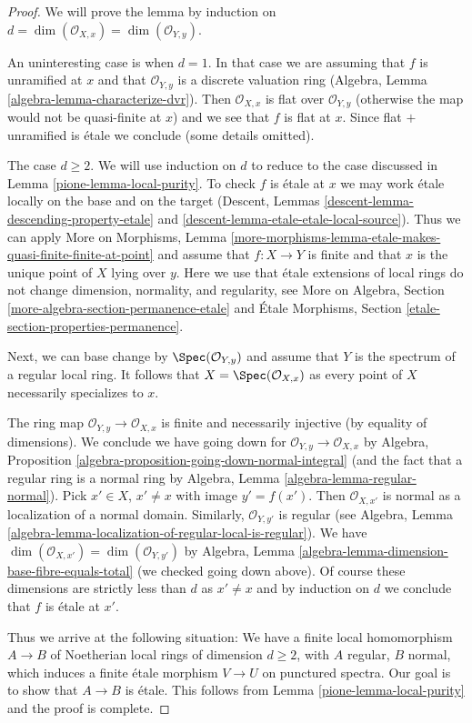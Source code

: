 \begin{proof}

We will prove the lemma by induction on
$d = \dim(\mathcal{O}_{X, x}) = \dim(\mathcal{O}_{Y, y})$.

\medskip\noindent
An uninteresting case is when $d = 1$.
In that case we are assuming that $f$ is unramified at $x$
and that $\mathcal{O}_{Y, y}$ is a discrete valuation ring
(Algebra, Lemma \ref{algebra-lemma-characterize-dvr}).
Then $\mathcal{O}_{X, x}$ is flat over $\mathcal{O}_{Y, y}$
(otherwise the map would not be quasi-finite at $x$)
and we see that $f$ is flat at $x$. Since flat $+$
unramified is \'etale we conclude (some details omitted).

\medskip\noindent
The case $d \geq 2$. We will use induction on $d$ to reduce
to the case discussed in Lemma \ref{pione-lemma-local-purity}.
To check $f$ is \'etale at $x$ we may work \'etale locally
on the base and on the target
(Descent, Lemmas \ref{descent-lemma-descending-property-etale} and
\ref{descent-lemma-etale-etale-local-source}).
Thus we can apply More on Morphisms, Lemma
\ref{more-morphisms-lemma-etale-makes-quasi-finite-finite-at-point}
and assume that $f : X \to Y$ is finite and that $x$ is the unique
point of $X$ lying over $y$. Here we use that \'etale extensions of
local rings do not change dimension, normality, and regularity, see
More on Algebra, Section \ref{more-algebra-section-permanence-etale}
and
\'Etale Morphisms, Section \ref{etale-section-properties-permanence}.

\medskip\noindent
Next, we can base change by $\Spec(\mathcal{O}_{Y, y})$
and assume that $Y$ is the spectrum of a regular local ring.
It follows that $X = \Spec(\mathcal{O}_{X, x})$ as
every point of $X$ necessarily specializes to $x$.

\medskip\noindent
The ring map $\mathcal{O}_{Y, y} \to \mathcal{O}_{X, x}$ is
finite and necessarily injective (by equality of dimensions).
We conclude we have going down for
$\mathcal{O}_{Y, y} \to \mathcal{O}_{X, x}$ by
Algebra, Proposition \ref{algebra-proposition-going-down-normal-integral}
(and the fact that a regular ring is a normal ring by
Algebra, Lemma \ref{algebra-lemma-regular-normal}).
Pick $x' \in X$, $x' \not = x$ with image $y' = f(x')$.
Then $\mathcal{O}_{X, x'}$ is normal as a localization
of a normal domain. Similarly, $\mathcal{O}_{Y, y'}$ is
regular (see Algebra, Lemma
\ref{algebra-lemma-localization-of-regular-local-is-regular}).
We have $\dim(\mathcal{O}_{X, x'}) = \dim(\mathcal{O}_{Y, y'})$ by
Algebra, Lemma \ref{algebra-lemma-dimension-base-fibre-equals-total}
(we checked going down above).
Of course these dimensions are strictly less than $d$ as $x' \not = x$
and by induction on $d$ we conclude that $f$ is \'etale at $x'$.

\medskip\noindent
Thus we arrive at the following situation: We have a finite
local homomorphism $A \to B$ of Noetherian local rings
of dimension $d \geq 2$, with $A$ regular, $B$ normal, which
induces a finite \'etale morphism $V \to U$ on punctured spectra.
Our goal is to show that $A \to B$ is \'etale.
This follows from Lemma \ref{pione-lemma-local-purity}
and the proof is complete.
\end{proof}

